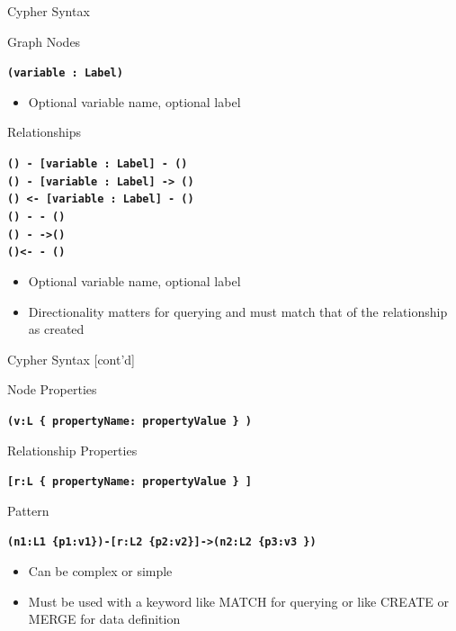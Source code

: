 \documentclass[ignorenonframetext,xcolor=x11names]{beamer}
\begin{document}
\begin{frame}[fragile]{Cypher Syntax}
\begin{block}{Graph Nodes}
\centering

\textbf{\texttt{(variable : Label)}}

\begin{itemize}
  \item Optional variable name, optional label
\end{itemize}
\end{block}

\begin{block}{Relationships}
\centering

\textbf{\texttt{\;\;() - [variable : Label] - ()\;\;}} \\
\textbf{\texttt{\;\;() - [variable : Label] -> ()}} \\
\textbf{\texttt{() <- [variable : Label] - ()\;\;}} \\
\textbf{\texttt{\;\;() - - ()}\;\;} \\
\textbf{\texttt{() - ->()}}  \\
\textbf{\texttt{\;()<- - ()\;}} \\

\begin{itemize}
  \item Optional variable name, optional label
  \item Directionality matters for querying and must match that of the relationship as created
\end{itemize}
\end{block}

\end{frame}

\begin{frame}[fragile]{Cypher Syntax \small [cont'd]}
\small
\begin{block}{Node Properties}
\centering

\textbf{\texttt{(v:L \{ propertyName: propertyValue \} )}}
\end{block}

\begin{block}{Relationship Properties}
\centering

\textbf{\texttt{[r:L \{ propertyName: propertyValue \} ]}}
\end{block}

\begin{block}{Pattern}
\centering

\textbf{\texttt{(n1:L1 \{p1:v1\})-[r:L2 \{p2:v2\}]->(n2:L2 \{p3:v3 \})}}
\begin{itemize}
  \item Can be complex or simple
  \item Must be used with a keyword like MATCH for querying or like CREATE or MERGE for data definition
\end{itemize}
\end{block}
\end{frame}
\end{document}
